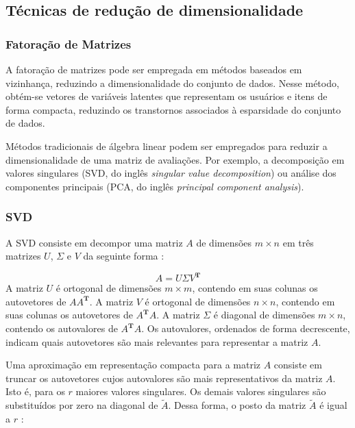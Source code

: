 \subsection{Técnicas de redução de dimensionalidade}
\subsubsection{Fatoração de Matrizes}
A fatoração de matrizes pode ser empregada em métodos baseados em vizinhança,
reduzindo a dimensionalidade do conjunto de dados. Nesse método, obtém-se
vetores de variáveis latentes que representam os usuários e itens de forma
compacta, reduzindo os transtornos associados à esparsidade do conjunto de
dados.

Métodos tradicionais de álgebra linear podem ser empregados para reduzir a
dimensionalidade de uma matriz de avaliações. Por exemplo, a decomposição em
valores singulares (SVD, do inglês \textit{singular value decomposition}) ou
análise dos componentes principais (PCA, do inglês \textit{principal component
analysis}).

\subsubsection{SVD}
A SVD consiste em decompor uma matriz $A$ de dimensões $m \times n$ em três
matrizes $U$, $\Sigma$ e $V$ da seguinte forma \cite{strang2006linear}:

\begin{equation}
    A = U \Sigma V^{\mathbf{T}}
    \label{eq:SVD}
\end{equation}
A matriz $U$ é ortogonal de dimensões $m \times m$, contendo em suas colunas
os autovetores de $AA^{\mathbf{T}}$. A matriz $V$ é ortogonal de dimensões $n
\times n$, contendo em suas colunas os autovetores de $A^{\mathbf{T}}A$. A
matriz $\Sigma$ é diagonal de dimensões $m \times n$, contendo os  autovalores
de $A^{\mathbf{T}}A$. Os autovalores, ordenados de forma decrescente, indicam
quais autovetores são mais relevantes para representar a matriz $A$.

Uma aproximação em representação compacta para a matriz $A$ consiste em truncar
os autovetores cujos autovalores são mais representativos da matriz $A$. Isto é,
para os $r$ maiores valores singulares. Os demais valores singulares são
substituídos por zero na diagonal de $\tilde{A}$. Dessa forma, o posto da matriz
$\tilde{A}$ é igual a $r$ \cite{brunton2022data}:

